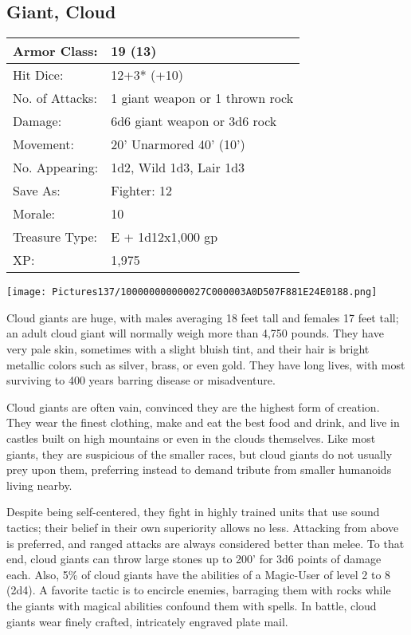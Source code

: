 \documentclass[a4paper,twoside,openany,10pt]{book}
\begin{document}
\begin{multicols}{2}
	



\subsection*{Giant, Cloud}\label{giant-cloud}

\begin{tabularx}{0.48\textwidth}{@{}lX@{}}
Armor Class: & 19 (13) \\\hline
Hit Dice: & 12+3* (+10) \\\hline
No. of Attacks: & 1 giant weapon or 1 thrown rock \\\hline
Damage: & 6d6 giant weapon or 3d6 rock \\\hline
Movement: & 20' Unarmored 40'
(10') \\\hline
No. Appearing: & 1d2, Wild 1d3, Lair 1d3 \\\hline
Save As: & Fighter: 12 \\\hline
Morale: & 10 \\\hline
Treasure Type: & E + 1d12x1,000 gp \\\hline
XP: & 1,975 \\\hline
\end{tabularx}\medskip


\begin{center}
	\texttt{[image: Pictures137/100000000000027C000003A0D507F881E24E0188.png]}
\end{center}

Cloud giants are huge, with males averaging 18 feet tall and females 17 feet tall; an adult cloud giant will normally weigh more than 4,750 pounds. They have very pale skin, sometimes with a slight bluish tint, and their hair is bright metallic colors such as silver, brass, or even gold. They have long lives, with most surviving to 400 years barring disease or misadventure.

Cloud giants are often vain, convinced they are the highest form of creation. They wear the finest clothing, make and eat the best food and drink, and live in castles built on high mountains or even in the clouds themselves. Like most giants, they are suspicious of the smaller races, but cloud giants do not usually prey upon them, preferring instead to demand tribute from smaller humanoids living nearby.

Despite being self-centered, they fight in highly trained units that use sound tactics; their belief in their own superiority allows no less. Attacking from above is preferred, and ranged attacks are always considered better than melee. To that end, cloud giants can throw large stones up to 200' for 3d6 points of damage each. Also, 5\% of cloud giants have the abilities of a Magic-User of level 2 to 8 (2d4). A favorite tactic is to encircle enemies, barraging them with rocks while the giants with magical abilities confound them with spells. In battle, cloud giants wear finely crafted, intricately engraved plate mail.



\end{multicols}
\end{document}
